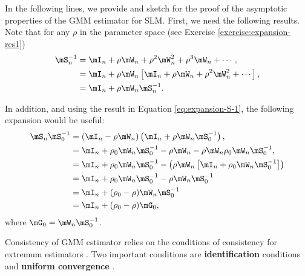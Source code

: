 \documentclass[english,12pt]{book}\usepackage[]{graphicx}\usepackage[]{xcolor}
\begin{document}
In the following lines, we provide and sketch for the proof of the asymptotic properties of the GMM estimator for SLM. First,  we need the following results. Note that for any $\rho$ in the parameter space (see Exercise \ref{exercise:expansion-res1})
\begin{equation}\label{eq:expansion-S-1}
\begin{aligned}
  \mS_n^{-1} & = \mI_n + \rho\mW_n + \rho^2\mW_n^2 + \rho^3\mW_n + \cdots, \\
  & = \mI_n + \rho\mW_n\left[\mI_n + \rho\mW_n + \rho^2\mW_n^2 + \cdots\right], \\
  & = \mI_n + \rho\mW_n\mS_n^{-1}.
\end{aligned}
\end{equation}

In addition, and using the result in Equation \eqref{eq:expansion-S-1}, the following expansion would be useful:
\begin{equation}\label{eq:expansion-S-2}
\begin{aligned}
  \mS_n\mS_0^{-1}& = \left(\mI_n - \rho \mW_n\right)\left(\mI_n + \rho\mW_n\mS_0^{-1}\right),  \\
                 & = \mI_n + \rho_0\mW_n\mS_0^{-1} - \rho\mW_n - \rho\mW_n\rho_0\mW_n\mS_0^{-1}, \\
                 & = \mI_n + \rho_0\mW_n\mS_0^{-1} - \left(\rho\mW_n\left[\mI_n + \rho_0\mW_n\mS_0^{-1}\right]\right) \\
                 & = \mI_n + \rho_0\mW_n\mS_0^{-1} - \rho\mW_n\mS_0^{-1} \\
                 & = \mI_n + (\rho_0 - \rho)\mW_n\mS_0^{-1} \\
                 & = \mI_n + (\rho_0 - \rho)\mG_0, \\
\end{aligned}                 
\end{equation}
%
where $\mG_0 = \mW_n\mS_0^{-1}$.

Consistency of GMM estimator relies on the conditions of consistency for extremum estimators \citep{hansen1982large, newey1994large}. Two important conditions are \textbf{identification} conditions and \textbf{uniform convergence} \citep{lee2003best, lee2007gmm}. 
\end{document}
